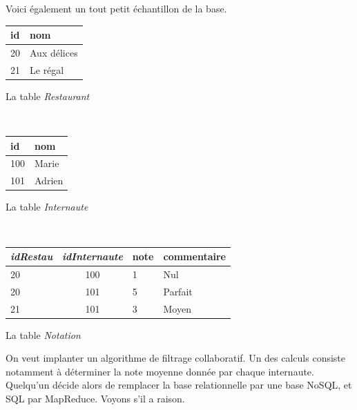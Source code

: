 \documentclass[11pt,a4paper]{article}
\newcommand{\cle}[1]{\textbf{#1}}
\def\fk#1{\textit{#1}}
\def\tble#1{\textit{#1}}
\begin{document}
\vspace*{0.2cm}

Voici également un tout petit échantillon de la base.

\vspace*{0.2cm}
\begin{minipage}[b]{2.5cm}
\begin{tabular}{l|l}
\cle{id} & nom\\
\hline
20 & Aux délices \\
21 & Le régal \\
\hline
\end{tabular}

\centerline{La table \tble{Restaurant}}
\end{minipage} \hspace*{0.5cm} \
\begin{minipage}[b]{3cm}
\begin{tabular}{l|l}
\cle{id} &  nom  \\
\hline
100 & Marie \\
101 & Adrien \\
\hline
\end{tabular}

\centerline{La table \tble{Internaute}}
\end{minipage} \hspace*{0.3cm} \
\begin{minipage}[b]{3cm}
\begin{tabular}{l|c|l|l}
\cle{\fk{idRestau}} & \cle{\fk{idInternaute}}  & note & commentaire \\
\hline
20  & 100  & 1 & Nul\\
20 & 101  & 5 & Parfait\\
21 & 101  & 3 & Moyen\\
\hline
\end{tabular}

\centerline{La table \tble{Notation}}
\end{minipage}

\vspace*{0.2cm}
On veut implanter  un algorithme de filtrage collaboratif. Un des calculs consiste notamment
à déterminer la note moyenne donnée par chaque internaute. 
Quelqu'un décide alors de remplacer la base relationnelle par une base NoSQL, et SQL par MapReduce.
Voyons s'il a raison.
\end{document}
